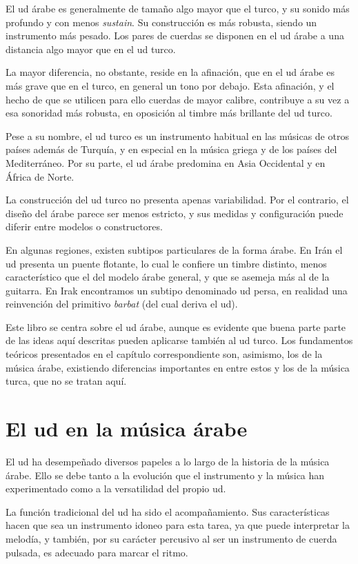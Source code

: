 El ud árabe es generalmente de tamaño algo mayor que el turco, y su sonido más profundo y con menos \emph{sustain}. Su construcción es más robusta, siendo un instrumento más pesado. Los pares de cuerdas se disponen en el ud árabe a una distancia algo mayor que en el ud turco.

La mayor diferencia, no obstante, reside en la afinación, que en el ud árabe es más grave que en el turco, en general un tono por debajo. Esta afinación, y el hecho de que se utilicen para ello cuerdas de mayor calibre, contribuye a su vez a esa sonoridad más robusta, en oposición al timbre más brillante del ud turco.

Pese a su nombre, el ud turco es un instrumento habitual en las músicas de otros países además de Turquía, y en especial en la música griega y de los países del Mediterráneo. Por su parte, el ud árabe predomina en Asia Occidental y en África de Norte.

La construcción del ud turco no presenta apenas variabilidad. Por el contrario, el diseño del árabe parece ser menos estricto, y sus medidas y configuración puede diferir entre modelos o constructores.

En algunas regiones, existen subtipos particulares de la forma árabe. En Irán el ud presenta un puente flotante, lo cual le confiere un timbre distinto, menos característico que el del modelo árabe general, y que se asemeja más al de la guitarra. En Irak encontramos un subtipo denominado ud persa, en realidad una reinvención del primitivo \emph{barbat} (del cual deriva el ud).

Este libro se centra sobre el ud árabe, aunque es evidente que buena parte parte de las ideas aquí descritas pueden aplicarse también al ud turco. Los fundamentos teóricos presentados en el capítulo correspondiente son, asimismo, los de la música árabe, existiendo diferencias importantes en entre estos y los de la música turca, que no se tratan aquí.

\section{El ud en la música árabe}

El ud ha desempeñado diversos papeles a lo largo de la historia de la música árabe. Ello se debe tanto a la evolución que el instrumento y la música han experimentado como a la versatilidad del propio ud.

La función tradicional del ud ha sido el acompañamiento. Sus características hacen que sea un instrumento idoneo para esta tarea, ya que puede interpretar la melodía, y también, por su carácter percusivo al ser un instrumento de cuerda pulsada, es adecuado para marcar el ritmo.

